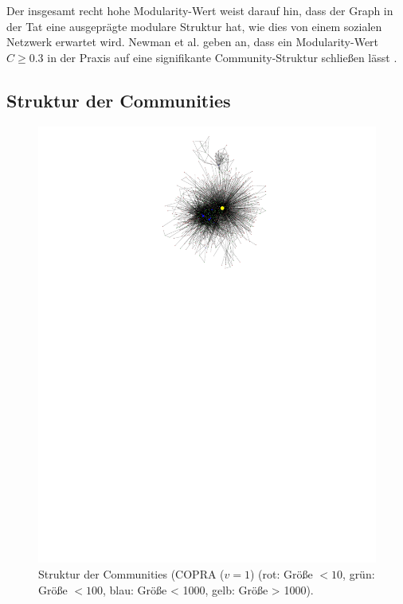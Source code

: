 Der insgesamt recht hohe Modularity-Wert weist darauf hin, dass der
Graph in der Tat eine ausgeprägte modulare Struktur hat, wie dies
von einem sozialen Netzwerk erwartet wird. Newman et al. geben an,
dass ein Modularity-Wert $C \ge 0.3$ in der Praxis auf eine
signifikante Community-Struktur schließen lässt \cite{Clauset2004}.

\subsection{Struktur der Communities}
\label{sec:strukt-der-comm}

\begin{figure}[h!]
  \centering
  \includegraphics[scale=2]{images/metagraph-copra1-minsize5.pdf}
  \caption{Struktur der Communities (COPRA ($v=1$) (rot: Größe
    $<10$, grün: Größe $<100$, blau: Größe < 1000, gelb:
    Größe > 1000).}
  \label{fig:metagraph-com-copra}
\end{figure}

